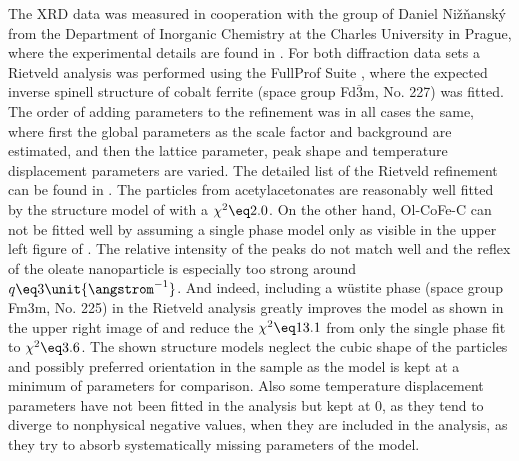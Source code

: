 \documentclass[\main/dresen_thesis.tex]{subfiles}
\begin{document}
    The XRD data was measured in cooperation with the group of Daniel Nižňanský from the Department of Inorganic Chemistry at the Charles University in Prague, where the experimental details are found in .
    For both diffraction data sets a Rietveld analysis was performed using the FullProf Suite \cite{Rodriguez_1993_Recen}, where the expected inverse spinell structure of cobalt ferrite (space group Fd$\bar{3}$m, No. 227) was fitted.
    The order of adding parameters to the refinement was in all cases the same, where first the global parameters as the scale factor and background are estimated, and then the lattice parameter, peak shape and temperature displacement parameters are varied.
    The detailed list of the Rietveld refinement can be found in .
    The particles from acetylacetonates are reasonably well fitted by the structure model of  with a $\chi^2 \eq 2.0$.
    On the other hand, Ol-CoFe-C can not be fitted well by assuming a single phase model only as visible in the upper left figure of .
    The relative intensity of the peaks do not match well and the reflex of the oleate nanoparticle is especially too strong around $q \eq 3 \unit{\angstrom^{-1}}$.
    And indeed, including a w\"ustite phase (space group Fm3m, No. 225) in the Rietveld analysis greatly improves the model as shown in the upper right image of  and reduce the $\chi^2 \eq 13.1$ from only the single phase fit to $\chi^2 \eq 3.6$.
    The shown structure models neglect the cubic shape of the particles and possibly preferred orientation in the sample as the model is kept at a minimum of parameters for comparison.
    Also some temperature displacement parameters have not been fitted in the analysis but kept at $0$, as they tend to diverge to nonphysical negative values, when they are included in the analysis, as they try to absorb systematically missing parameters of the model.
\end{document}
